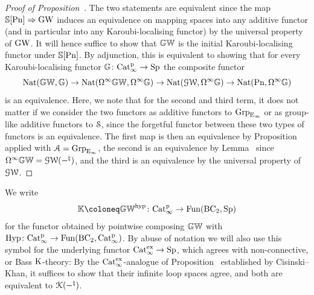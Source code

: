 \begin{proof}[Proof of Proposition~]
The two statements are equivalent since the map $\mathbb{S}[\mathrm{Pn}] \Rightarrow \operatorname{GW}$ induces an equivalence on mapping spaces into any additive functor (and in particular into any Karoubi-localising functor) by the universal property of $\operatorname{GW}$. It will hence suffice to show that $\mathbb{GW}$ is the initial Karoubi-localising functor under $\mathbb{S}[\mathrm{Pn}]$. By adjunction, this is equivalent to showing that for every Karoubi-localising functor $\mathbb{G} \colon \mathrm{Cat}^{\mathrm p}_\infty \to \mathrm{Sp}$ the composite functor
\[
\operatorname{Nat}(\mathbb{GW},\mathbb{G}) \to \operatorname{Nat}(\Omega^{\infty}\mathbb{GW},\Omega^{\infty}\mathbb{G}) \to \operatorname{Nat}(\operatorname{\mathcal{GW}},\Omega^{\infty}\mathbb{G}) \to \operatorname{Nat}(\mathrm{Pn},\Omega^{\infty}\mathbb{G})
\]
is an equivalence. Here, we note that for the second and third term, it does not matter if we consider the two functors as additive functors to $\operatorname{Grp}_{{\mathrm{E}_{\infty}}}$ or as group-like additive functors to $\mathcal S$, since the forgetful functor between these two types of functors is an equivalence. The first map is then an equivalence by Proposition~ applied with $\mathcal{A} = \operatorname{Grp}_{{\mathrm{E}_{\infty}}}$, the second is an equivalence by Lemma~ since $\Omega^{\infty}\mathbb{GW} = \operatorname{\mathcal{GW}}(-^{\natural})$, and the third is an equivalence by the universal property of $\operatorname{\mathcal{GW}}$.
\end{proof}

We write 
\[
\KK \coloneq \KGW^{\hyp} \colon \Catp \to \Fun(\B\Ct, \Sp)
\]
for the functor obtained by pointwise composing $\mathbb{GW}$ with $\operatorname{Hyp}\colon \mathrm{Cat}^{\mathrm p}_\infty\to \operatorname{Fun}(\mathrm{B}\mathrm{C_2}, \mathrm{Cat}^{\mathrm p}_\infty)$. By abuse of notation we will also use this symbol for the underlying functor $\mathrm{Cat}_\infty^{\mathrm{ex}} \to \mathrm{Sp}$, which agrees with non-connective, or Bass $\operatorname K$-theory: By the $\mathrm{Cat}_\infty^{\mathrm{ex}}$-analogue of Proposition~ established by Cisinski--Khan, it suffices to show that their infinite loop spaces agree, and both are equivalent to $\operatorname{\mathcal{K}}(-^\natural)$.


